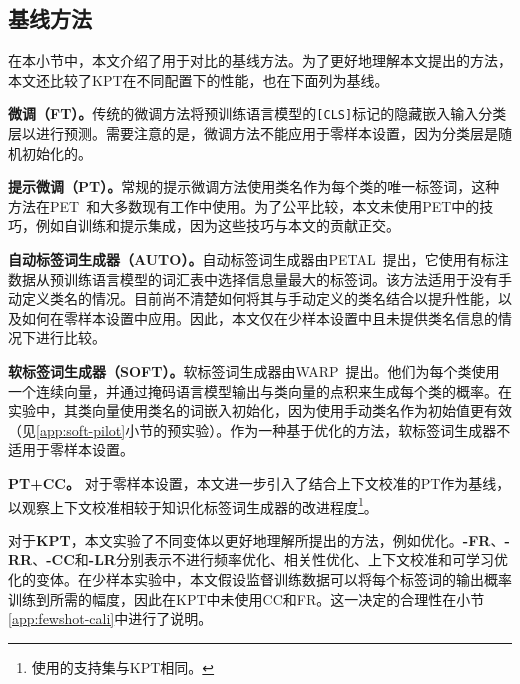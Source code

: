 \subsection{基线方法}
在本小节中，本文介绍了用于对比的基线方法。为了更好地理解本文提出的方法，本文还比较了KPT在不同配置下的性能，也在下面列为基线。

\textbf{微调（FT）。}\quad 传统的微调方法将预训练语言模型的\texttt{[CLS]}标记的隐藏嵌入输入分类层以进行预测。需要注意的是，微调方法不能应用于零样本设置，因为分类层是随机初始化的。

\textbf{提示微调（PT）。}\quad 常规的提示微调方法使用类名作为每个类的唯一标签词，这种方法在PET~\cite{schick2020exploiting}和大多数现有工作中使用。为了公平比较，本文未使用PET中的技巧，例如自训练和提示集成，因为这些技巧与本文的贡献正交。

\textbf{自动标签词生成器（AUTO）。}\quad 自动标签词生成器由PETAL~\cite{schick2020automatically}提出，它使用有标注数据从预训练语言模型的词汇表中选择信息量最大的标签词。该方法适用于没有手动定义类名的情况。目前尚不清楚如何将其与手动定义的类名结合以提升性能，以及如何在零样本设置中应用。因此，本文仅在少样本设置中且未提供类名信息的情况下进行比较。

\textbf{软标签词生成器（SOFT）。}\quad 软标签词生成器由WARP~\cite{hambardzumyan-etal-2021-warp}提出。他们为每个类使用一个连续向量，并通过掩码语言模型输出与类向量的点积来生成每个类的概率。在实验中，其类向量使用类名的词嵌入初始化，因为使用手动类名作为初始值更有效（见\ref{app:soft-pilot}小节的预实验）。作为一种基于优化的方法，软标签词生成器不适用于零样本设置。

\textbf{PT+CC。} 对于零样本设置，本文进一步引入了结合上下文校准的PT作为基线，以观察上下文校准相较于知识化标签词生成器的改进程度\footnote{使用的支持集与KPT相同。}。

对于\textbf{KPT}，本文实验了不同变体以更好地理解所提出的方法，例如优化。\textbf{-FR}、\textbf{-RR}、\textbf{-CC}和\textbf{-LR}分别表示不进行频率优化、相关性优化、上下文校准和可学习优化的变体。在少样本实验中，本文假设监督训练数据可以将每个标签词的输出概率训练到所需的幅度，因此在KPT中未使用CC和FR。这一决定的合理性在小节\ref{app:fewshot-cali}中进行了说明。


